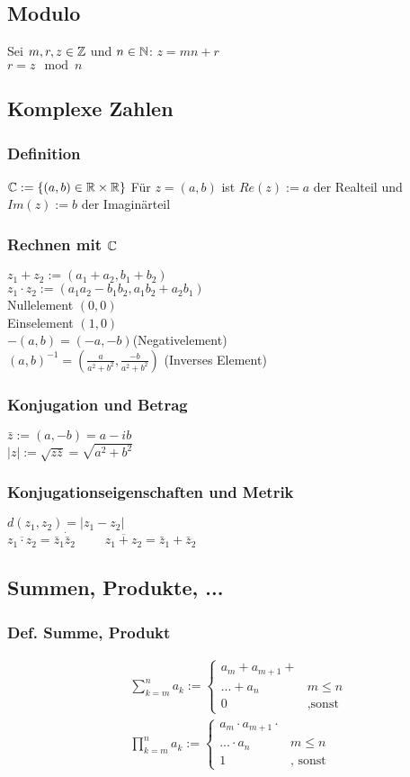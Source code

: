 \subsection*{Modulo}
Sei $m, r, z \in \mathbb Z$ und $n \in \mathbb N$:
$z = mn + r$\\
$r = z \mod n$
\subsection*{Komplexe Zahlen}

\subsubsection*{Definition}
$\mathbb C := \{(a, b) \in \mathbb R \times \mathbb R\}$
Für $z = (a, b)$ ist $Re(z) := a$ der Realteil und $Im(z) := b$ der Imaginärteil
\subsubsection*{Rechnen mit \texorpdfstring{$\mathbb C$}{Komplexen Zahlen}}
$z_1 + z_2 := (a_1 + a_2, b_1 + b_2)$\\
$z_1 \cdot z_2 := (a_1a_2 - b_1b_2, a_1b_2 + a_2b_1)$\\
Nullelement $(0,0)$\\
Einselement $(1, 0)$\\
$-(a, b) = (-a, -b)$(Negativelement)\\
$(a, b)^{-1} = \left(\frac{a}{a^2 + b^2}, \frac{-b}{a^2 + b^2}\right)$ (Inverses Element)
\subsubsection*{Konjugation und Betrag}
$\bar z := (a, -b) = a - ib$\\
$|z| := \sqrt{z \bar z} = \sqrt{a^2 + b^2}$
\subsubsection*{Konjugationseigenschaften und Metrik}
$d(z_1, z_2) = |z_1 - z_2|$\\
$\overline{z_1 \cdot z_2} = \bar z_1 \dot \bar z_2 \quad\quad$
$\overline{z_1 + z_2} = \bar z_1 + \bar z_2$
\subsection*{Summen, Produkte, ...}
\subsubsection*{Def. Summe, Produkt}
\begin{align*}
    &\sum_{k = m}^n a_k := \begin{cases}
    a_m + a_{m+1} +  \\
    ... + a_n & m \leq n\\
    0 &\text{,sonst}
    \end{cases}\\
    &\prod_{k = m}^{n} a_k :=\begin{cases}
    a_m \cdot a_{m+1} \cdot  \\
    ... \cdot a_n & m \leq n\\
    1 &\text{, sonst}
    \end{cases}
\end{align*}
